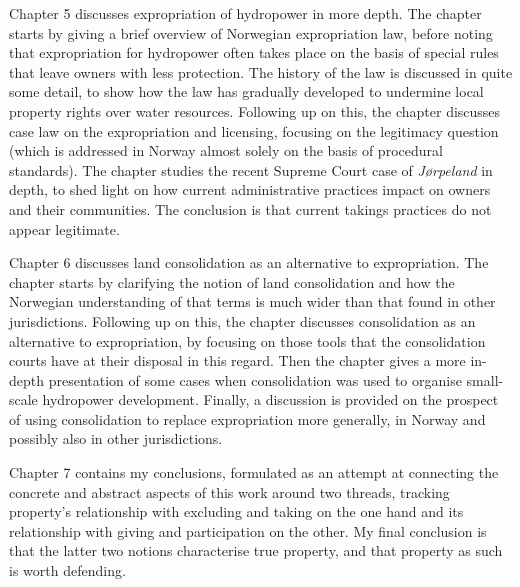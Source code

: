 {Chapter 5 discusses expropriation of hydropower in more depth. The chapter starts by giving a brief overview of Norwegian expropriation law, before noting that expropriation for hydropower often takes place on the basis of special rules that leave owners with less protection. The history of the law is discussed in quite some detail, to show how the law has gradually developed to undermine local property rights over water resources. Following up on this, the chapter discusses case law on the expropriation and licensing, focusing on the legitimacy question (which is addressed in Norway almost solely on the basis of procedural standards). The chapter studies the recent Supreme Court case of {\it Jørpeland} in depth, to shed light on how current administrative practices impact on owners and their communities. The conclusion is that current takings practices do not appear legitimate.

Chapter 6 discusses land consolidation as an alternative to expropriation. The chapter starts by clarifying the notion of land consolidation and how the Norwegian understanding of that terms is much wider than that found in other jurisdictions. Following up on this, the chapter discusses consolidation as an alternative to expropriation, by focusing on those tools that the consolidation courts have at their disposal in this regard. Then the chapter gives a more in-depth presentation of some cases when consolidation was used to organise small-scale hydropower development. Finally, a discussion is provided on the prospect of using consolidation to replace expropriation more generally, in Norway and possibly also in other jurisdictions.

Chapter 7 contains my conclusions, formulated as an attempt at connecting the concrete and abstract aspects of this work around two threads, tracking property's relationship with excluding and taking on the one hand and its relationship with giving and participation on the other. My final conclusion is that the latter two notions characterise true property, and that property as such is worth defending.

}